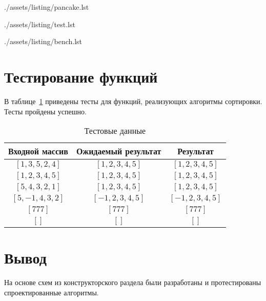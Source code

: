 \clearpage
\begin{lstinputlisting}[
	caption={Алгоритм блинной сортировки},
	label={lst:pancake},
	style={golang}
]{./assets/listing/pancake.lst}
\end{lstinputlisting}

\clearpage
\begin{lstinputlisting}[
	caption={Пример реализации теста},
	label={lst:tests},
	style={golang}
]{./assets/listing/test.lst}
\end{lstinputlisting}

\clearpage
\begin{lstinputlisting}[
	caption={Пример реализации бенчмарка},
	label={lst:benches},
	style={golang}
]{./assets/listing/bench.lst}
\end{lstinputlisting}

\section{Тестирование функций}

В таблице~\ref{tbl:test} приведены тесты для функций, реализующих алгоритмы сортировки. Тесты пройдены успешно.

\begin{table}[h!]
	\begin{center}
		\caption{\label{tbl:test}Тестовые данные}
		\begin{tabular}{|c|c|c|}
			\hline
			Входной массив & Ожидаемый результат & Результат \\ 
			\hline
			$[1,3,5,2,4]$ & $[1,2,3,4,5]$  & $[1,2,3,4,5]$\\
			$[1,2,3,4,5]$  & $[1,2,3,4,5]$ & $[1,2,3,4,5]$\\
			$[5,4,3,2,1]$  & $[1,2,3,4,5]$  & $[1,2,3,4,5]$\\
			$[5,-1,4,3,2]$  & $[-1,2,3,4,5]$  & $[-1,2,3,4,5]$\\
			$[777]$  & $[777]$  & $[777]$\\
			$[]$  & $[]$  & $[]$\\
			\hline
		\end{tabular}
	\end{center}
\end{table}

\section*{Вывод}

На основе схем из конструкторского раздела были разработаны и протестированы спроектированные алгоритмы.
